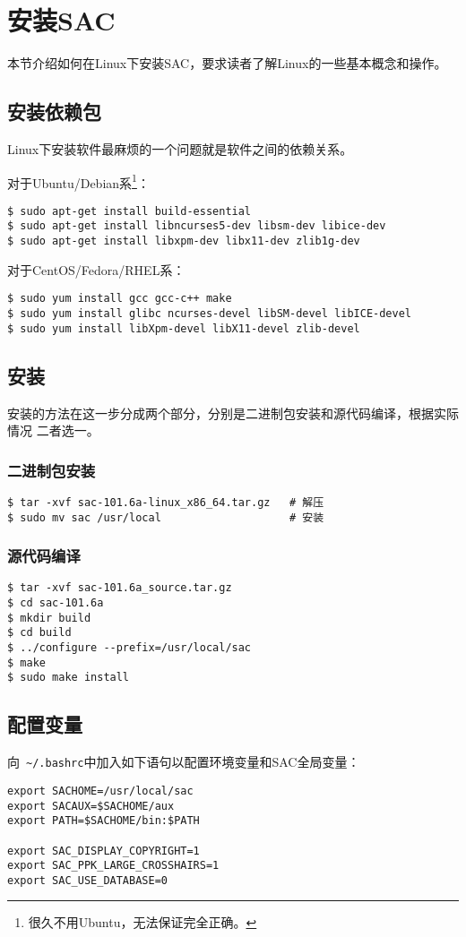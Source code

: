 \section{安装SAC}
\label{sec:sac-install}
本节介绍如何在Linux下安装SAC，要求读者了解Linux的一些基本概念和操作。

\subsection*{安装依赖包}
Linux下安装软件最麻烦的一个问题就是软件之间的依赖关系。

对于Ubuntu/Debian系\footnote{很久不用Ubuntu，无法保证完全正确。}：
\begin{verbatim}
$ sudo apt-get install build-essential
$ sudo apt-get install libncurses5-dev libsm-dev libice-dev
$ sudo apt-get install libxpm-dev libx11-dev zlib1g-dev
\end{verbatim}

对于CentOS/Fedora/RHEL系：
\begin{verbatim}
$ sudo yum install gcc gcc-c++ make
$ sudo yum install glibc ncurses-devel libSM-devel libICE-devel
$ sudo yum install libXpm-devel libX11-devel zlib-devel
\end{verbatim}

\subsection*{安装}
安装的方法在这一步分成两个部分，分别是二进制包安装和源代码编译，根据实际情况
二者选一。
\subsubsection*{二进制包安装}
\begin{verbatim}
$ tar -xvf sac-101.6a-linux_x86_64.tar.gz   # 解压
$ sudo mv sac /usr/local                    # 安装
\end{verbatim}

\subsubsection*{源代码编译}
\begin{verbatim}
$ tar -xvf sac-101.6a_source.tar.gz
$ cd sac-101.6a
$ mkdir build
$ cd build
$ ../configure --prefix=/usr/local/sac
$ make
$ sudo make install
\end{verbatim}

\subsection*{配置变量}
向~\verb+~/.bashrc+中加入如下语句以配置环境变量和SAC全局变量：
\begin{verbatim}
export SACHOME=/usr/local/sac
export SACAUX=$SACHOME/aux
export PATH=$SACHOME/bin:$PATH

export SAC_DISPLAY_COPYRIGHT=1
export SAC_PPK_LARGE_CROSSHAIRS=1
export SAC_USE_DATABASE=0
\end{verbatim}

